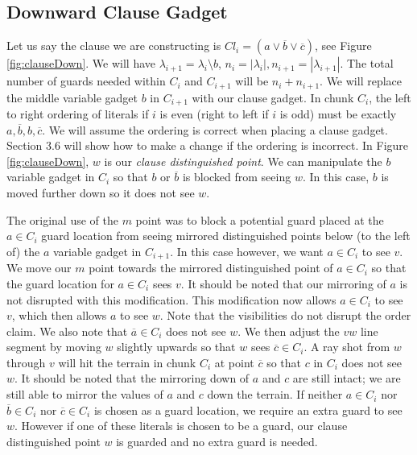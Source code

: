 \documentclass[11pt]{article}
\begin{document}
\subsection{Downward Clause Gadget}

Let us say the clause we are constructing is $Cl_i = (a \vee \overline{b} \vee \overline{c})$, see Figure \ref{fig:clauseDown}.  We will have $\lambda_{i+1} = \lambda_i \setminus b$, $n_i = | \lambda_i |, n_{i+1} = | \lambda_{i+1} |$.  The total number of guards needed within $C_i$ and $C_{i+1}$ will be $n_i + n_{i+1}$.  We will replace the middle variable gadget $b$ in $C_{i+1}$ with our clause gadget.  In chunk $C_i$, the left to right ordering of literals if $i$ is even (right to left if $i$ is odd) must be exactly $a, \overline{b}, b, \overline{c}$.  We will assume the ordering is correct when placing a clause gadget.  Section 3.6 will show how to make a change if the ordering is incorrect.  In Figure \ref{fig:clauseDown}, $w$ is our \textit{clause distinguished point}.  We can manipulate the $b$ variable gadget in $C_i$ so that $b$ or $\overline{b}$ is blocked from seeing $w$.  In this case, $b$ is moved further down so it does not see $w$.

The original use of the $m$ point was to block a potential guard placed at the $a \in C_i$ guard location from seeing mirrored distinguished points below (to the left of) the $a$ variable gadget in $C_{i+1}$.  In this case however, we want $a \in C_i$ to see $v$.  We move our $m$ point towards the mirrored distinguished point of $a \in C_i$ so that the guard location for $a \in C_i$ sees $v$.  It should be noted that our mirroring of $a$ is not disrupted with this modification.  This modification now allows $a \in C_i$ to see $v$, which then allows $a$ to see $w$.  Note that the visibilities do not disrupt the order claim.  We also note that $\overline{a} \in C_i$ does not see $w$.  We then adjust the $vw$ line segment by moving $w$ slightly upwards so that $w$ sees $\overline{c} \in C_i$.  A ray shot from $w$ through $v$ will hit the terrain in chunk $C_i$ at point $\overline{c}$ so that $c$ in $C_i$ does not see $w$.  It should be noted that the mirroring down of $a$ and $c$ are still intact; we are still able to mirror the values of $a$ and $c$ down the terrain.  If neither $a \in C_i$ nor $\overline{b} \in C_i$ nor $\overline{c} \in C_i$ is chosen as a guard location, we require an extra guard to see $w$.  However if one of these literals is chosen to be a guard, our clause distinguished point $w$ is guarded and no extra guard is needed.
\end{document}
